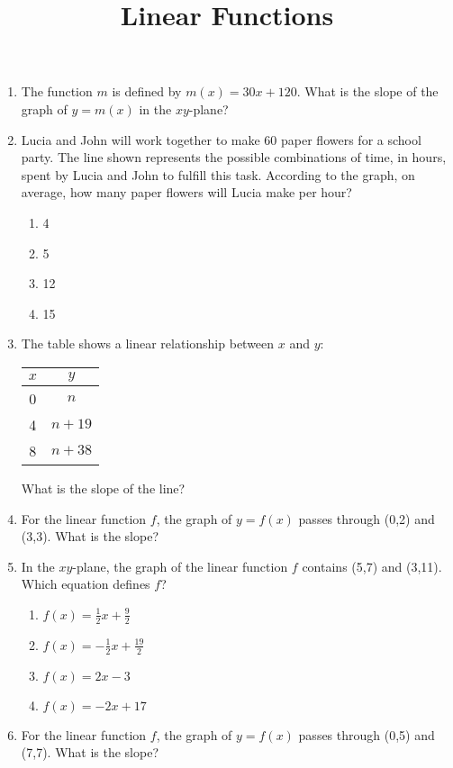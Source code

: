 \documentclass[12pt]{exam}
\begin{document}
\title{Linear Functions}
\begin{enumerate}
    \item The function $m$ is defined by $m(x) = 30x + 120$. What is the slope of the graph of $y = m(x)$ in the $xy$-plane?
    \item Lucia and John will work together to make 60 paper flowers for a school party. The line shown represents the possible combinations of time, in hours, spent by Lucia and John to fulfill this task. According to the graph, on average, how many paper flowers will Lucia make per hour?
    \begin{enumerate}[label=\Alph*)]
        \item 4
        \item 5
        \item 12
        \item 15
    \end{enumerate}
    \item The table shows a linear relationship between $x$ and $y$:
    \begin{center}
        \begin{tabular}{|c|c|}
            \hline
            $x$ & $y$ \\
            \hline
            0 & $n$ \\
            4 & $n + 19$ \\
            8 & $n + 38$ \\
            \hline
        \end{tabular}
    \end{center}
    What is the slope of the line?
    \item For the linear function $f$, the graph of $y = f(x)$ passes through (0,2) and (3,3). What is the slope?
    \item In the $xy$-plane, the graph of the linear function $f$ contains (5,7) and (3,11). Which equation defines $f$?
    \begin{enumerate}[label=\Alph*)]
        \item $f(x) = \frac{1}{2}x + \frac{9}{2}$
        \item $f(x) = -\frac{1}{2}x + \frac{19}{2}$
        \item $f(x) = 2x - 3$
        \item $f(x) = -2x + 17$
    \end{enumerate}
    \item For the linear function $f$, the graph of $y = f(x)$ passes through (0,5) and (7,7). What is the slope?

\end{enumerate}
\end{document}
